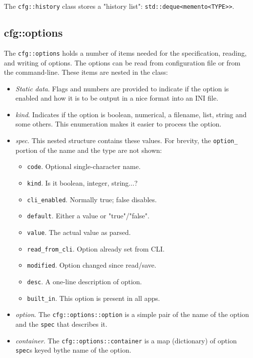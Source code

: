    The \texttt{cfg::history} class stores a "history list":
   \texttt{std::deque<memento<TYPE>>}.

\subsection{cfg::options}
\label{subsec:cfg_namespace_options}

   The \texttt{cfg::options} holds a number of items needed for the
   specification, reading, and writing of options.
   The options can be read from configuration file or from the command-line.
   These items are nested in the class:

   \begin{itemize}
      \item \textsl{Static data}.
         Flags and numbers are provided to indicate if the option is enabled
         and how it is to be output in a nice format into an INI file.
      \item \textsl{kind}.
         Indicates if the option is boolean, numerical, a filename, list,
         string and some others. This enumeration makes it easier to
         process the option.
      \item \textsl{spec}.
         This nested structure contains these values. For brevity, the
         \texttt{option\_} portion of the name and the type are not shown:
         \begin{itemize}
            \item \texttt{code}.
               Optional single-character name.
            \item \texttt{kind}.
               Is it boolean, integer, string...?
            \item \texttt{cli\_enabled}.
               Normally true; false disables.
            \item \texttt{default}.
               Either a value or "true"/"false".
            \item \texttt{value}.
               The actual value as parsed.
            \item \texttt{read\_from\_cli}.
               Option already set from CLI.
            \item \texttt{modified}.
               Option changed since read/save.
            \item \texttt{desc}.
               A one-line description of option.
            \item \texttt{built\_in}.
               This option is present in all apps.
         \end{itemize}
      \item \textsl{option}.
         The \texttt{cfg::options::option} is a simple pair of the
         name of the option and the \texttt{spec} that describes it.
      \item \textsl{container}.
         The \texttt{cfg::options::container} is a map (dictionary) of
         option \texttt{spec}s keyed bythe name of the option.
   \end{itemize}

